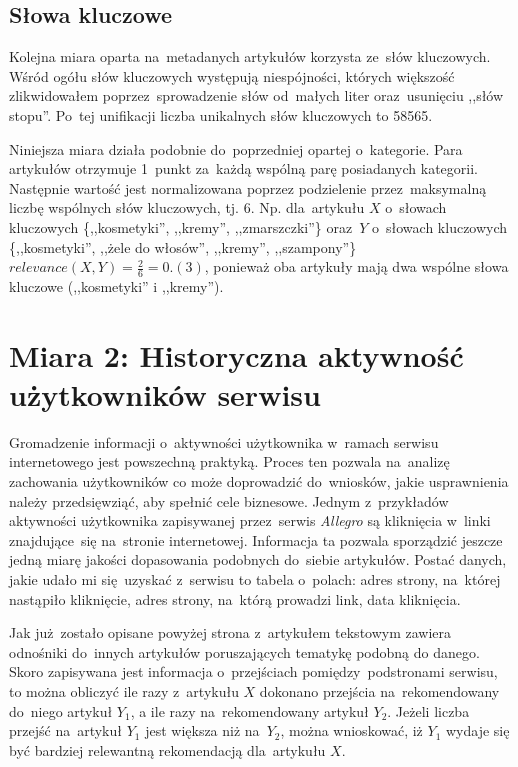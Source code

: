\documentclass[pl]{minipw} %
\begin{document}
\subsection{Słowa kluczowe}

Kolejna miara oparta na~metadanych artykułów korzysta ze~słów kluczowych. Wśród ogółu słów kluczowych występują niespójności, których większość zlikwidowałem poprzez~sprowadzenie słów od~małych liter oraz~usunięciu ,,słów stopu''. Po~tej unifikacji liczba unikalnych słów kluczowych to 58565.

Niniejsza miara działa podobnie do~poprzedniej opartej o~kategorie. Para artykułów otrzymuje 1~punkt za~każdą wspólną parę posiadanych kategorii. Następnie wartość jest normalizowana poprzez podzielenie przez~maksymalną liczbę wspólnych słów kluczowych, tj. 6. Np. dla~artykułu $X$ o~słowach kluczowych \{,,kosmetyki'', ,,kremy'', ,,zmarszczki''\} oraz~$Y$ o~słowach kluczowych \{,,kosmetyki'', ,,żele do włosów'', ,,kremy'', ,,szampony''\} $relevance(X,Y)=\frac{2}{6}=0.(3)$, ponieważ oba artykuły mają dwa wspólne słowa kluczowe (,,kosmetyki'' i ,,kremy'').

\section{Miara 2: Historyczna aktywność użytkowników serwisu}

Gromadzenie informacji o~aktywności użytkownika w~ramach serwisu internetowego jest powszechną praktyką. Proces ten pozwala na~analizę zachowania użytkowników co może doprowadzić do~wniosków, jakie usprawnienia należy przedsięwziąć, aby spełnić cele biznesowe. Jednym z~przykładów aktywności użytkownika zapisywanej przez~serwis \textit{Allegro} są kliknięcia w~linki znajdujące~się na~stronie internetowej. Informacja ta pozwala sporządzić jeszcze jedną miarę jakości dopasowania podobnych do~siebie artykułów. Postać danych, jakie udało mi się~uzyskać z~serwisu to tabela o~polach: adres strony, na~której nastąpiło kliknięcie, adres strony, na~którą prowadzi link, data kliknięcia.

Jak już zostało opisane powyżej strona z~artykułem tekstowym zawiera odnośniki do~innych artykułów poruszających tematykę podobną do danego. Skoro zapisywana jest informacja o~przejściach pomiędzy~podstronami serwisu, to można obliczyć ile razy z~artykułu $X$ dokonano przejścia na~rekomendowany do~niego artykuł $Y_1$, a ile razy na~rekomendowany artykuł $Y_2$. Jeżeli liczba przejść na~artykuł $Y_1$ jest większa niż na~$Y_2$, można wnioskować, iż $Y_1$ wydaje się być bardziej relewantną rekomendacją dla~artykułu $X$.
\end{document}

